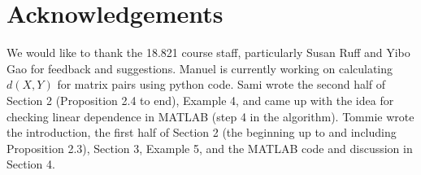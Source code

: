 \documentclass[11pt]{amsart}
\numberwithin{equation}{section}
\numberwithin{figure}{section}
\numberwithin{theorem}{section}
\begin{document}
\section*{Acknowledgements}
We would like to thank the 18.821 course staff, particularly Susan Ruff and Yibo Gao for feedback and suggestions. Manuel is currently working on calculating $d(X,Y)$ for matrix pairs using python code. Sami wrote the second half of Section 2 (Proposition 2.4 to end), Example 4, and came up with the idea for checking linear dependence in MATLAB (step 4 in the algorithm). Tommie wrote the introduction, the first half of Section 2 (the beginning up to and including Proposition 2.3), Section 3, Example 5, and the MATLAB code and discussion in Section 4.  
\end{document}
